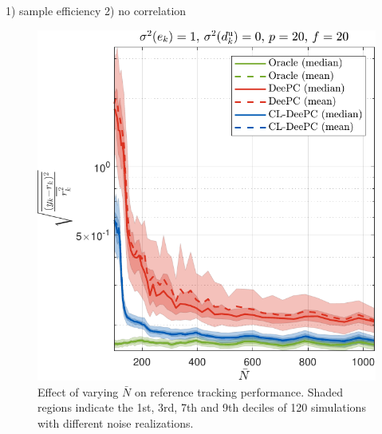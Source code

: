 1) sample efficiency
2) no correlation
\begin{figure}[b!]
\begin{center}
\includegraphics[width=\columnwidth]{results/figures/Varying_Nbar_99-1039-50_p_20_f_20_Re_1_Ru_1_Rdu_0_Q_100_R_0_dR_10.pdf}    %
\caption{Effect of varying $\bar{N}$ on reference tracking performance. Shaded regions indicate the 1st, 3rd, 7th and 9th deciles of 120 simulations with different noise realizations.}  %
\label{fig:varying_Nbar}                                 %
\end{center}                                 %
\end{figure}

